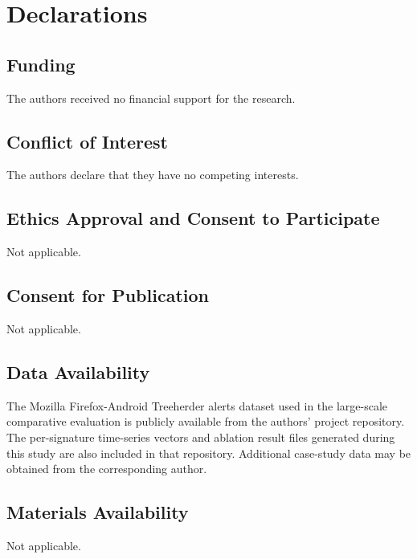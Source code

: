 \documentclass[pdflatex,sn-nature]{sn-jnl}%
\theoremstyle{thmstyleone}%
\theoremstyle{thmstyletwo}%
\theoremstyle{thmstylethree}%
\begin{document}




\section*{Declarations}

\subsection*{Funding}
The authors received no financial support for the research.

\subsection*{Conflict of Interest}
The authors declare that they have no competing interests.

\subsection*{Ethics Approval and Consent to Participate}
Not applicable.

\subsection*{Consent for Publication}
Not applicable.

\subsection*{Data Availability}
The Mozilla Firefox-Android Treeherder alerts dataset used in the large-scale comparative evaluation is publicly available from the authors' project repository. The per-signature time-series vectors and ablation result files generated during this study are also included in that repository. Additional case-study data may be obtained from the corresponding author.

\subsection*{Materials Availability}
Not applicable.
\end{document}
